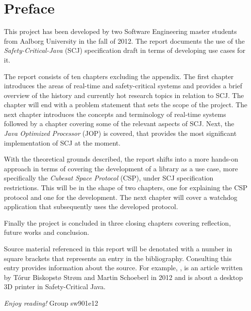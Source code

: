\newpage
\thispagestyle{empty}
\mbox{}

\chapter*{Preface}
This project has been developed by two Software Engineering master students from Aalborg University in the fall of 2012. The report documents the use of the \textit{Safety-Critical-Java} (SCJ) specification draft in terms of developing use cases for it.

\vspace{4mm}
\noindent The report consists of ten chapters excluding the appendix. The first chapter introduces the areas of real-time and safety-critical systems and provides a brief overview of the history and currently hot research topics in relation to SCJ. The chapter will end with a problem statement that sets the scope of the project. The next chapter introduces the concepts and terminology of real-time systems followed by a chapter covering some of the relevant aspects of SCJ. Next, the \textit{Java Optimized Processor} (JOP) is covered, that provides the most significant implementation of SCJ at the moment.

With the theoretical grounds described, the report shifts into a more hands-on approach in terms of covering the development of a library as a use case, more specifically the \textit{Cubesat Space Protocol} (CSP), under SCJ specification restrictions. This will be in the shape of two chapters, one for explaining the CSP protocol and one for the development. The next chapter will cover a watchdog application that subsequently uses the developed protocol.

Finally the project is concluded in three closing chapters covering reflection, future works and conclusion. 

\vspace{4mm}
\noindent Source material referenced in this report will be denotated with a number in square brackets that represents an entry in the bibliography. Consulting this entry provides information about the source. For example, \cite{Schoeberl:2012:RepRap}, is an article written by T\'{o}rur Biskopst{\o} Str{\o}m and Martin Schoeberl in 2012 and is about a desktop 3D printer in Safety-Critical Java.

\vspace{5mm}
	\begin{flushright}
\emph{Enjoy reading!} Group sw901e12
	\end{flushright}

\newpage
